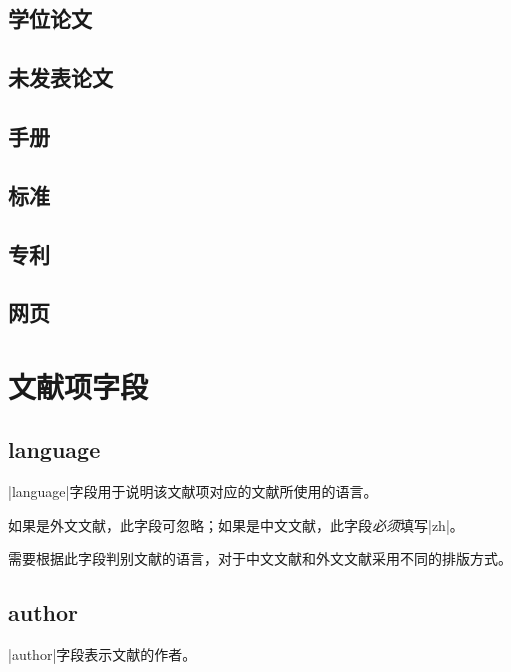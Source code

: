 \subsection{学位论文}

\subsection{未发表论文}

\subsection{手册}

\subsection{标准}

\subsection{专利}

\subsection{网页}


\section{文献项字段}\label{sec:bib-field}

\subsection{language}

|language|字段用于说明该文献项对应的文献所使用的语言。

\begin{note}
如果是外文文献，此字段可忽略；如果是中文文献，此字段\emph{必须}填写|zh|。
\end{note}

{\BibTeX}需要根据此字段判别文献的语言，对于中文文献和外文文献采用不同的排版方式。

\subsection{author}

|author|字段表示文献的作者。

